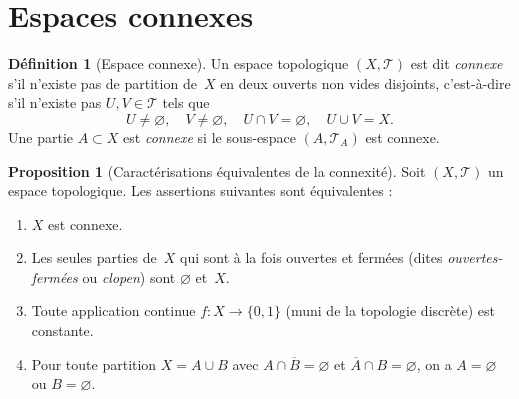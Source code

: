 \documentclass[12pt,a4paper,openany]{book}
\theoremstyle{definition}
\newtheorem{definition}{Définition}[chapter]
\theoremstyle{cours}
\newtheorem{proposition}[theoreme]{Proposition}
\theoremstyle{coursnormal}
\begin{document}
\section{Espaces connexes}
\label{sec:espaces-connexes}

\begin{definition}[Espace connexe]
\label{def:connexe}
Un espace topologique $(X,\mathcal{T})$ est dit \emph{connexe} s'il n'existe pas de
partition de~$X$ en deux ouverts non vides disjoints, c'est-à-dire s'il n'existe
pas $U,V \in \mathcal{T}$ tels que
\[
U \neq \varnothing, \quad V \neq \varnothing, \quad U \cap V = \varnothing, \quad
U \cup V = X.
\]
Une partie $A \subset X$ est \emph{connexe} si le sous-espace $(A,\mathcal{T}_A)$ est connexe.
\end{definition}

\begin{proposition}[Caractérisations équivalentes de la connexité]
\label{prop:equiv-connexe}
Soit $(X,\mathcal{T})$ un espace topologique. Les assertions suivantes sont équivalentes :
\begin{enumerate}[label=(\roman*)]
  \item $X$ est connexe.
  \item Les seules parties de~$X$ qui sont à la fois ouvertes et fermées (dites
        \emph{ouvertes-fermées} ou \emph{clopen})
        sont $\varnothing$ et~$X$.
  \item Toute application continue $f \colon X \to \{0,1\}$ (muni de la topologie discrète)
        est constante.
  \item Pour toute partition $X = A \cup B$ avec $A \cap \overline{B} = \varnothing$
        et $\overline{A} \cap B = \varnothing$, on a $A = \varnothing$ ou $B = \varnothing$.
\end{enumerate}
\end{proposition}
\end{document}
